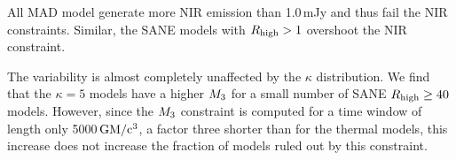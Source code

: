 


All MAD model generate more NIR emission than 1.0\,mJy and thus fail the NIR constraints. Similar, the SANE models with $R_{\rm high}>1$ overshoot the NIR constraint.


The variability is almost completely unaffected by the $\kappa$ distribution. We find that the $\kappa=5$ models have a higher $M_{3}$ for a small number of SANE $R_{\rm high}\geq 40$ models. However, since the $M_{3}$ constraint is computed for a time window of length only 5000\,$\rm{GM/c^3}$, a factor three shorter than for the thermal models, this increase does not increase the fraction of models ruled out by this constraint.





